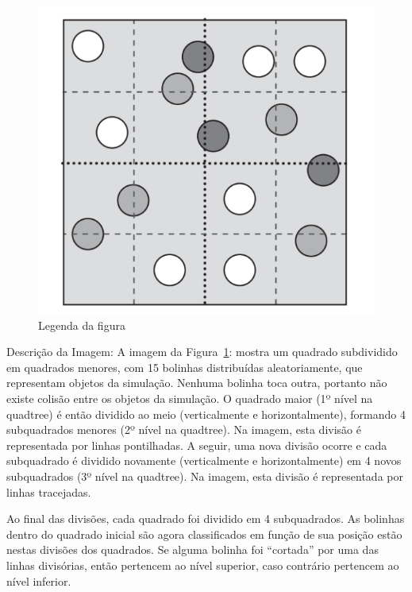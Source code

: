 \begin{figure}[htb]
  \centering
	\caption{\label{fig:figura2} Legenda da figura}
	\includegraphics[scale=0.5]{Imagens/Figura_7.11.png} %
\end{figure}

\noindent\footnotesize Descrição da Imagem: A imagem da Figura~\ref{fig:figura2}: mostra um quadrado subdividido em quadrados menores, com 15 bolinhas distribuídas aleatoriamente, que representam objetos da simulação. Nenhuma bolinha toca outra, portanto não existe colisão entre os objetos da simulação. O quadrado maior (1º nível na quadtree) é então dividido ao meio (verticalmente e horizontalmente), formando 4 subquadrados menores (2º nível na quadtree). Na imagem, esta divisão é representada por linhas pontilhadas. A seguir, uma nova divisão ocorre e cada subquadrado é dividido novamente (verticalmente e horizontalmente) em 4 novos subquadrados (3º nível na quadtree). Na imagem, esta divisão é representada por linhas tracejadas. 

\noindent\footnotesize Ao final das divisões, cada quadrado foi dividido em 4 subquadrados. As bolinhas dentro do quadrado inicial são agora classificados em função de sua posição estão nestas divisões dos quadrados. Se alguma bolinha foi “cortada” por uma das linhas divisórias, então pertencem ao nível superior, caso contrário pertencem ao nível inferior.

